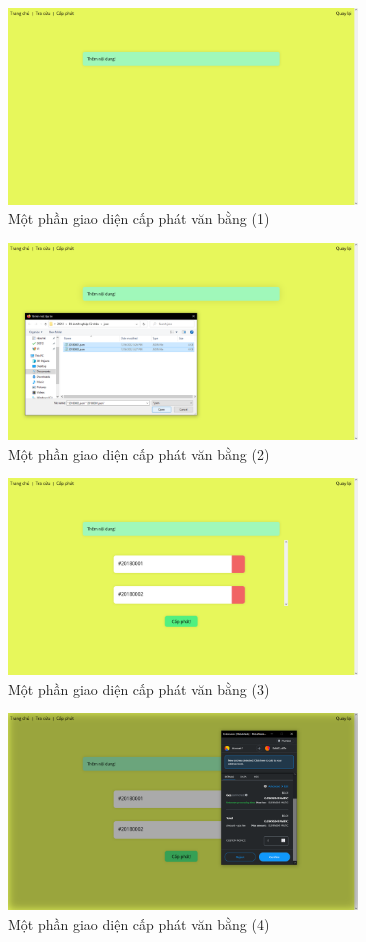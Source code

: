 \newpage
\begin{figure}[!ht]
    \centering
    \includegraphics[width=350px]{anh/giai-phap/giao-dien-cap-phat-1.png}
    \caption{Một phần giao diện cấp phát văn bằng (1)}
\end{figure}
\begin{figure}[!ht]
    \centering
    \includegraphics[width=350px]{anh/giai-phap/giao-dien-cap-phat-2.png}
    \caption{Một phần giao diện cấp phát văn bằng (2)}
\end{figure}

\newpage
\begin{figure}[!ht]
    \centering
    \includegraphics[width=350px]{anh/giai-phap/giao-dien-cap-phat-3.png}
    \caption{Một phần giao diện cấp phát văn bằng (3)}
\end{figure}
\begin{figure}[!ht]
    \centering
    \includegraphics[width=350px]{anh/giai-phap/giao-dien-cap-phat-4.png}
    \caption{Một phần giao diện cấp phát văn bằng (4)}
\end{figure}

